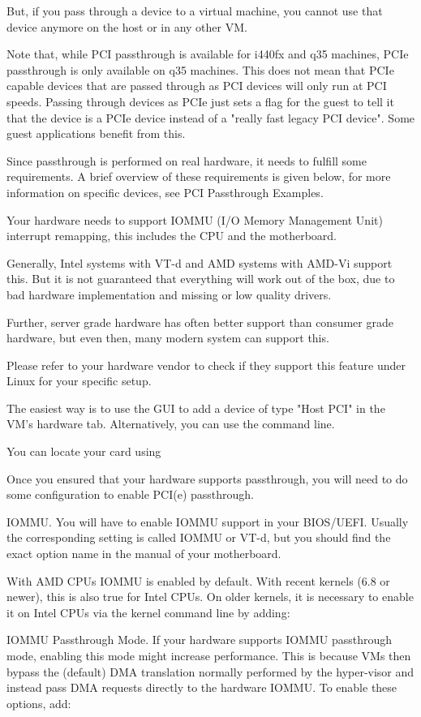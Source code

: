 But, if you pass through a device to a virtual machine, you cannot use that device anymore on the host or in any other VM.

Note that, while PCI passthrough is available for i440fx and q35 machines, PCIe passthrough is only available on q35 machines. This does not mean that PCIe capable devices that are passed through as PCI devices will only run at PCI speeds. Passing through devices as PCIe just sets a flag for the guest to tell it that the device is a PCIe device instead of a "really fast legacy PCI device". Some guest applications benefit from this.

Since passthrough is performed on real hardware, it needs to fulfill some requirements. A brief overview of these requirements is given below, for more information on specific devices, see PCI Passthrough Examples.

Your hardware needs to support IOMMU (I/O Memory Management Unit) interrupt remapping, this includes the CPU and the motherboard.

Generally, Intel systems with VT-d and AMD systems with AMD-Vi support this. But it is not guaranteed that everything will work out of the box, due to bad hardware implementation and missing or low quality drivers.

Further, server grade hardware has often better support than consumer grade hardware, but even then, many modern system can support this.

Please refer to your hardware vendor to check if they support this feature under Linux for your specific setup.

The easiest way is to use the GUI to add a device of type "Host PCI" in the VM’s hardware tab. Alternatively, you can use the command line.

You can locate your card using

Once you ensured that your hardware supports passthrough, you will need to do some configuration to enable PCI(e) passthrough.

IOMMU. You will have to enable IOMMU support in your BIOS/UEFI. Usually the corresponding setting is called IOMMU or VT-d, but you should find the exact option name in the manual of your motherboard.

With AMD CPUs IOMMU is enabled by default. With recent kernels (6.8 or newer), this is also true for Intel CPUs. On older kernels, it is necessary to enable it on Intel CPUs via the kernel command line by adding:

IOMMU Passthrough Mode. If your hardware supports IOMMU passthrough mode, enabling this mode might increase performance. This is because VMs then bypass the (default) DMA translation normally performed by the hyper-visor and instead pass DMA requests directly to the hardware IOMMU. To enable these options, add:

